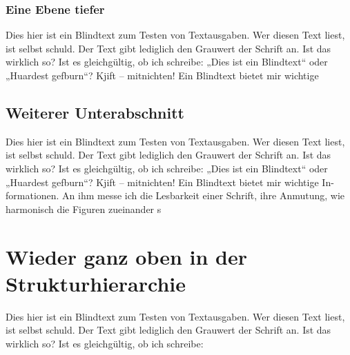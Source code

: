 \documentclass[a4paper]{scrartcl}
\begin{document}
			\subsubsection{Eine Ebene tiefer}
				Dies hier ist ein Blindtext zum Testen von Textausgaben. Wer diesen Text liest, ist selbst schuld. Der
				Text gibt lediglich den Grauwert der Schrift an. Ist das wirklich so? Ist es gleichgültig, ob ich schreibe:
				„Dies ist ein Blindtext“ oder „Huardest gefburn“? Kjift – mitnichten! Ein Blindtext bietet mir wichtige
		
		\subsection{Weiterer Unterabschnitt}
			Dies hier ist ein Blindtext zum Testen von Textausgaben. Wer diesen Text liest, ist selbst schuld. Der
			Text gibt lediglich den Grauwert der Schrift an. Ist das wirklich so? Ist es gleichgültig, ob ich schreibe:
			„Dies ist ein Blindtext“ oder „Huardest gefburn“? Kjift – mitnichten! Ein Blindtext bietet mir wichtige In-
			formationen. An ihm messe ich die Lesbarkeit einer Schrift, ihre Anmutung, wie harmonisch die Figuren
			zueinander s
			
	\section{Wieder ganz oben in der Strukturhierarchie}
		Dies hier ist ein Blindtext zum Testen von Textausgaben. Wer diesen Text liest, ist selbst schuld. Der
		Text gibt lediglich den Grauwert der Schrift an. Ist das wirklich so? Ist es gleichgültig, ob ich schreibe:
	
\end{document}

